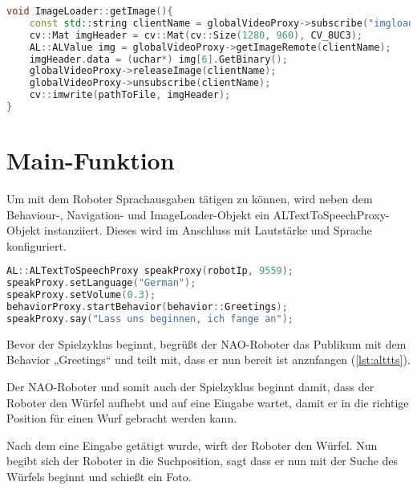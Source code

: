 \begin{lstlisting}[language=c++,
                   caption={Funktion: "`ImageLoader::getImage()''},
                   label={lst:imgget}]
void ImageLoader::getImage(){
    const std::string clientName = globalVideoProxy->subscribe("imgloader", AL::k4VGA, AL::kBGRColorSpace, 5);
    cv::Mat imgHeader = cv::Mat(cv::Size(1280, 960), CV_8UC3);
    AL::ALValue img = globalVideoProxy->getImageRemote(clientName);
    imgHeader.data = (uchar*) img[6].GetBinary();
    globalVideoProxy->releaseImage(clientName);
    globalVideoProxy->unsubscribe(clientName);
    cv::imwrite(pathToFile, imgHeader);
}
\end{lstlisting}

\chapter{Main-Funktion}

    Um mit dem Roboter Sprachausgaben tätigen zu können, wird neben dem
    Behaviour-, Navigation- und ImageLoader-Objekt ein
    ALTextToSpeechProxy-Objekt instanziiert.
    Dieses wird im Anschluss mit Lautstärke und Sprache konfiguriert.

\begin{lstlisting}[language=c++,
                   caption={Instanziierung ALTextToSpeechProxy},
                   label={lst:alttts}]
AL::ALTextToSpeechProxy speakProxy(robotIp, 9559);
speakProxy.setLanguage("German");
speakProxy.setVolume(0.3);
behaviorProxy.startBehavior(behavior::Greetings);
speakProxy.say("Lass uns beginnen, ich fange an");
\end{lstlisting}

    Bevor der Spielzyklus beginnt, begrüßt der NAO-Roboter das Publikum mit
    dem Behavior „Greetings“ und teilt mit, dass er nun bereit ist
    anzufangen (\autoref{lst:alttts}).

    Der NAO-Roboter und somit auch der Spielzyklus beginnt damit, dass der
    Roboter den Würfel aufhebt und auf eine Eingabe wartet, damit er
    in die richtige Position für einen Wurf gebracht werden kann.

    Nach dem eine Eingabe getätigt wurde, wirft der Roboter den Würfel.
    Nun begibt sich der Roboter in die Suchposition, sagt dass
    er nun mit der Suche des Würfels beginnt und schießt ein Foto.

